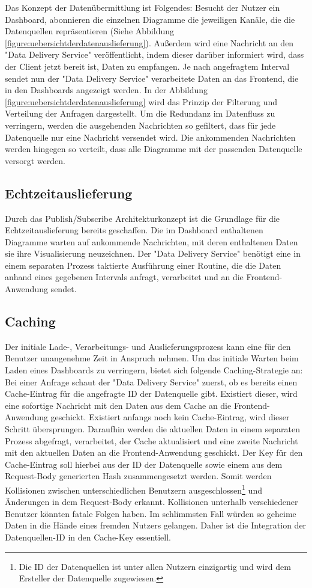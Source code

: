 Das Konzept der Datenübermittlung ist Folgendes: Besucht der Nutzer ein Dashboard,
abonnieren die einzelnen Diagramme die jeweiligen Kanäle, die die Datenquellen 
repräsentieren (Siehe Abbildung \ref{figure:uebersichtderdatenauslieferung}).
Außerdem wird eine Nachricht an den "Data Delivery Service" veröffentlicht,
indem dieser darüber informiert wird, dass der Client jetzt bereit ist, Daten zu empfangen.
Je nach angefragtem Interval sendet nun der "Data Delivery Service" verarbeitete
Daten an das Frontend, die in den Dashboards angezeigt werden. 
In der Abbildung \ref{figure:uebersichtderdatenauslieferung} wird das Prinzip
der Filterung und Verteilung der Anfragen dargestellt.
Um die Redundanz im Datenfluss zu verringern, werden die ausgehenden Nachrichten
so gefiltert, dass für jede Datenquelle nur eine Nachricht versendet wird. Die ankommenden
Nachrichten werden hingegen so verteilt, dass alle Diagramme mit der passenden Datenquelle
versorgt werden.

\subsection{Echtzeitauslieferung}
\label{subsec:echtzeitauslieferung}
Durch das Publish/Subscribe Architekturkonzept ist die Grundlage für die Echtzeitauslieferung
bereits geschaffen. Die im Dashboard enthaltenen Diagramme warten auf ankommende Nachrichten,
mit deren enthaltenen Daten sie ihre Visualisierung neuzeichnen. Der "Data Delivery Service"
benötigt eine in einem separaten Prozess taktierte Ausführung einer Routine, die die Daten
anhand eines gegebenen Intervals anfragt, verarbeitet und an die Frontend-Anwendung sendet.

\subsection{Caching}
\label{subsec:caching}
Der initiale Lade-, Verarbeitungs- und Auslieferungsprozess kann eine für den Benutzer
unangenehme Zeit in Anspruch nehmen. Um das initiale Warten beim Laden eines Dashboards
zu verringern, bietet sich folgende Caching-Strategie an: Bei einer Anfrage schaut
der "Data Delivery Service" zuerst, ob es bereits einen Cache-Eintrag für die
angefragte ID der Datenquelle gibt. Existiert dieser, wird eine sofortige Nachricht
mit den Daten aus dem Cache an die Frontend-Anwendung geschickt. Existiert anfangs noch
kein Cache-Eintrag, wird dieser Schritt übersprungen. Daraufhin werden
die aktuellen Daten in einem separaten Prozess abgefragt, verarbeitet, der Cache
aktualisiert und eine zweite Nachricht mit den aktuellen Daten an die Frontend-Anwendung
geschickt. Der Key für den Cache-Eintrag soll hierbei aus der ID der Datenquelle sowie
einem aus dem Request-Body generierten Hash zusammengesetzt werden. Somit werden
Kollisionen zwischen unterschiedlichen Benutzern ausgeschlossen\footnote{Die ID der Datenquellen ist
unter allen Nutzern einzigartig und wird dem Ersteller der Datenquelle zugewiesen.}
und Änderungen in dem Request-Body erkannt. Kollisionen unterhalb verschiedener
Benutzer könnten fatale Folgen haben. Im schlimmsten Fall würden so geheime Daten
in die Hände eines fremden Nutzers gelangen. Daher ist die Integration der Datenquellen-ID
in den Cache-Key essentiell.

